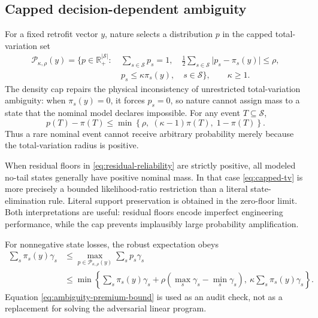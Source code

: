 \subsection{Capped decision-dependent ambiguity}
\label{sec:capped-tv}

For a fixed retrofit vector \(y\), nature selects a distribution \(p\) in
the capped total-variation set
\begin{equation}
\begin{split}
 \mathcal P_{\kappa,\rho}(y)=\bigg\{p\in\mathbb R_+^{\lvert\mathcal S\rvert}:
 &\ \sum_{s\in\mathcal S}p_s=1,\quad
 \frac{1}{2}\sum_{s\in\mathcal S}\lvert p_s-\pi_s(y)\rvert\leq\rho,
 \\[-1mm]
 &\ p_s\leq\kappa\pi_s(y),\quad s\in\mathcal S\bigg\},
 \qquad \kappa\geq1.
\end{split}
\label{eq:capped-tv}
\end{equation}
The density cap repairs the physical inconsistency of unrestricted
total-variation ambiguity: when \(\pi_s(y)=0\), it forces \(p_s=0\), so
nature cannot assign mass to a state that the nominal model declares
impossible. For any event \(T\subseteq\mathcal S\),
\begin{equation}
 p(T)-\pi(T)
 \leq
 \min\left\{\rho,\;(\kappa-1)\pi(T),\;1-\pi(T)\right\}.
\label{eq:rare-state-bound}
\end{equation}
Thus a rare nominal event cannot receive arbitrary probability merely because
the total-variation radius is positive.

When residual floors in \eqref{eq:residual-reliability} are strictly positive,
all modeled no-tail states generally have positive nominal mass. In that
case \eqref{eq:capped-tv} is more precisely a bounded likelihood-ratio
restriction than a literal state-elimination rule. Literal support
preservation is obtained in the zero-floor limit. Both interpretations are
useful: residual floors encode imperfect engineering performance, while the
cap prevents implausibly large probability amplification.

For nonnegative state losses, the robust expectation obeys
\begin{equation}
\begin{split}
\sum_s\pi_s(y)\gamma_s
&\leq
 \max_{p\in\mathcal P_{\kappa,\rho}(y)}
     \sum_s p_s\gamma_s\\
&\leq
 \min\left\{
   \sum_s\pi_s(y)\gamma_s+
       \rho\left(\max_s\gamma_s-\min_s\gamma_s\right),\
   \kappa\sum_s\pi_s(y)\gamma_s
 \right\}.
\end{split}
\label{eq:ambiguity-premium-bound}
\end{equation}
Equation \eqref{eq:ambiguity-premium-bound} is used as an audit check, not
as a replacement for solving the adversarial linear program.

